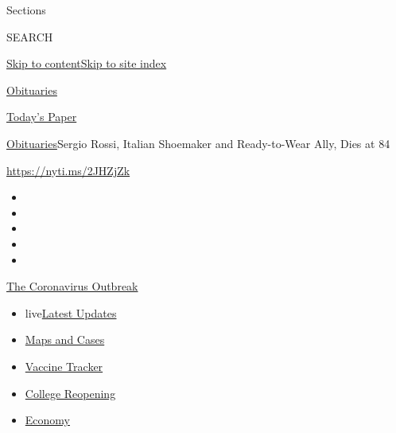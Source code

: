 Sections

SEARCH

\protect\hyperlink{site-content}{Skip to
content}\protect\hyperlink{site-index}{Skip to site index}

\href{https://www.nytimes3xbfgragh.onion/section/obituaries}{Obituaries}

\href{https://myaccount.nytimes3xbfgragh.onion/auth/login?response_type=cookie\&client_id=vi}{}

\href{https://www.nytimes3xbfgragh.onion/section/todayspaper}{Today's
Paper}

\href{/section/obituaries}{Obituaries}\textbar{}Sergio Rossi, Italian
Shoemaker and Ready-to-Wear Ally, Dies at 84

\url{https://nyti.ms/2JHZjZk}

\begin{itemize}
\item
\item
\item
\item
\item
\end{itemize}

\href{https://www.nytimes3xbfgragh.onion/news-event/coronavirus?action=click\&pgtype=Article\&state=default\&region=TOP_BANNER\&context=storylines_menu}{The
Coronavirus Outbreak}

\begin{itemize}
\tightlist
\item
  live\href{https://www.nytimes3xbfgragh.onion/2020/08/04/world/coronavirus-covid-19.html?action=click\&pgtype=Article\&state=default\&region=TOP_BANNER\&context=storylines_menu}{Latest
  Updates}
\item
  \href{https://www.nytimes3xbfgragh.onion/interactive/2020/us/coronavirus-us-cases.html?action=click\&pgtype=Article\&state=default\&region=TOP_BANNER\&context=storylines_menu}{Maps
  and Cases}
\item
  \href{https://www.nytimes3xbfgragh.onion/interactive/2020/science/coronavirus-vaccine-tracker.html?action=click\&pgtype=Article\&state=default\&region=TOP_BANNER\&context=storylines_menu}{Vaccine
  Tracker}
\item
  \href{https://www.nytimes3xbfgragh.onion/2020/08/02/us/covid-college-reopening.html?action=click\&pgtype=Article\&state=default\&region=TOP_BANNER\&context=storylines_menu}{College
  Reopening}
\item
  \href{https://www.nytimes3xbfgragh.onion/live/2020/08/03/business/stock-market-today-coronavirus?action=click\&pgtype=Article\&state=default\&region=TOP_BANNER\&context=storylines_menu}{Economy}
\end{itemize}


